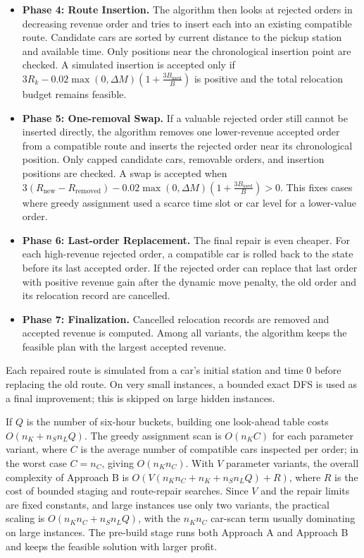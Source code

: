 \documentclass[10pt,a4paper]{article}
\begin{document}
\begin{itemize}[itemsep=2pt, parsep=0pt, topsep=4pt]
    \item \textbf{Phase 4: Route Insertion.} The algorithm then looks at
    rejected orders in decreasing revenue order and tries to insert each into an
    existing compatible route.  Candidate cars are sorted by current distance to
    the pickup station and available time.  Only positions near the chronological
    insertion point are checked.  A simulated insertion is accepted only if
    $3R_k - 0.02\max(0,\Delta M)\left(1+\frac{3B_{\text{used}}}{B}\right)$
    is positive and the total relocation budget remains feasible.

    \item \textbf{Phase 5: One-removal Swap.} If a valuable rejected order still
    cannot be inserted directly, the algorithm removes one lower-revenue
    accepted order from a compatible route and inserts the rejected order near
    its chronological position.  Only capped candidate cars, removable orders,
    and insertion positions are checked.  A swap is accepted when
    $3(R_{\text{new}}-R_{\text{removed}}) - 0.02\max(0,\Delta M)\left(1+\frac{3B_{\text{used}}}{B}\right)>0$.
    This fixes cases where greedy assignment used a scarce time slot or car
    level for a lower-value order.

    \item \textbf{Phase 6: Last-order Replacement.} The final repair is even
    cheaper.  For each high-revenue rejected order, a compatible car is rolled
    back to the state before its last accepted order.  If the rejected order can
    replace that last order with positive revenue gain after the dynamic move
    penalty, the old order and its relocation record are cancelled.

    \item \textbf{Phase 7: Finalization.} Cancelled relocation records are
    removed and accepted revenue is computed.  Among all variants, the algorithm
    keeps the feasible plan with the largest accepted revenue.
\end{itemize}

Each repaired route is simulated from a car's initial station and time 0 before replacing the old route.  On very small instances, a bounded exact DFS is used as a final improvement; this is skipped on large hidden instances.

If $Q$ is the number of six-hour buckets, building one look-ahead table costs
$O(n_K+n_Sn_LQ)$.  The greedy assignment scan is $O(n_KC)$ for each parameter
variant, where $C$ is the average number of compatible cars inspected per order;
in the worst case $C=n_C$, giving $O(n_Kn_C)$.  With $V$ parameter variants,
the overall complexity of Approach B is
$O\!\left(V(n_Kn_C+n_K+n_Sn_LQ)+R\right)$,
where $R$ is the cost of bounded staging and route-repair searches.  Since $V$
and the repair limits are fixed constants, and large instances use only two
variants, the practical scaling is $O(n_Kn_C+n_Sn_LQ)$,
with the $n_Kn_C$ car-scan term usually dominating on large instances.  The
pre-build stage runs both Approach A and Approach B and keeps the feasible
solution with larger profit.
\end{document}
